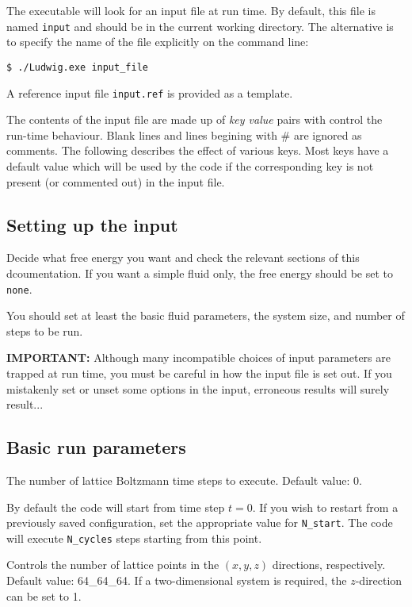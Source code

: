 The executable will look for an input file at run time.
By default, this file is named \texttt{input} and should be in the
current working directory. The alternative is to specify the name
of the file explicitly on the command line:
\begin{verbatim}
$ ./Ludwig.exe input_file
\end{verbatim}
A reference input file \texttt{input.ref} is provided as a template.

The contents of the input file are made up of \textit{key value}
pairs with control the run-time behaviour. Blank lines and lines
begining with \# are ignored as comments. The following describes
the effect of various keys. Most keys have a default value which
will be used by the code if the corresponding key is not present
(or commented out) in the input file.

\subsection{Setting up the input}

Decide what free energy you want and check the relevant sections
of this dcoumentation. If you want a simple fluid only, the free
energy should be set to \texttt{none}.

You should set at least the basic fluid parameters, the system
size, and number of steps to be run.

\textbf{IMPORTANT:} Although many incompatible choices of input
parameters are trapped at run time, you must be careful in how
the input file is set out. If you mistakenly set or unset some
options in the input, erroneous results will surely result...


\subsection{Basic run parameters}


The number of lattice Boltzmann time steps to execute. Default
value: 0.


By default the code will start from time step $t = 0$. If you 
wish to restart from a previously saved configuration, set
the appropriate value for \texttt{N\_start}. The code will
execute \texttt{N\_cycles} steps starting from this point.


Controls the number of lattice points in the $(x, y, z)$ directions,
respectively. Default value: 64\_64\_64. If a two-dimensional system
is required, the $z$-direction can be set to 1.


